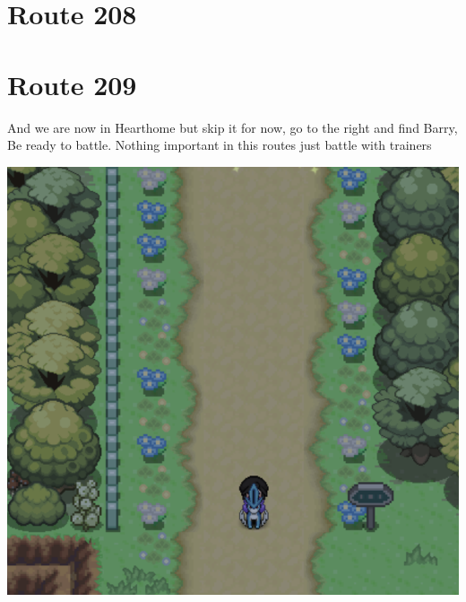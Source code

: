 \documentclass[11pt]{article}
\begin{document}
\section{Route 208}\label{sec:Route_208}


\section{Route 209}\label{sec:Route_209}
And we are now in Hearthome but skip it for now, go to the right and find Barry, Be ready to battle.
Nothing important in this routes just battle with trainers

\includegraphics[width=\textwidth]{walkthrough/Sinnoh/Route_209}


\end{document}
